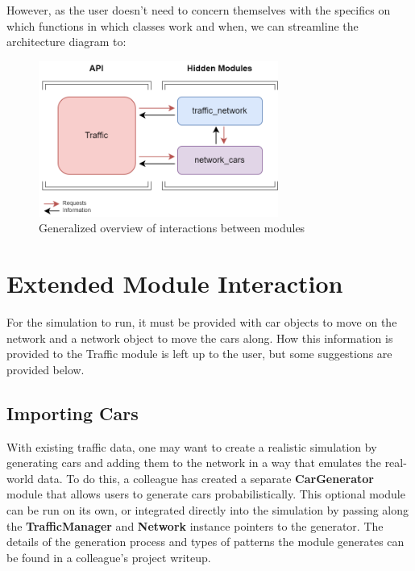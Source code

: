 \noindent  However, as the user doesn't need to concern themselves with the specifics on which functions in which classes work and when, we can streamline the architecture diagram to:

\begin{figure}[H]
    \centering
	\includegraphics[width=0.7\textwidth]{tex files/Figures/simplified_essentials.png}
	\caption[Software Interaction:  User View]{Generalized overview of interactions between modules}
	\label{fig:interactions_simplified}
\end{figure}



\section{Extended Module Interaction}

\par For the simulation to run, it must be provided with car objects to move on the network and a network object to move the cars along.  How this information is provided to the Traffic module is left up to the user, but some suggestions are provided below.

\subsection{Importing Cars}

\par With existing traffic data, one may want to create a realistic simulation by generating cars and adding them to the network in a way that emulates the real-world data.  To do this, a colleague has created a separate \textbf{CarGenerator} module that allows users to generate cars probabilistically.  This optional module can be run on its own, or integrated directly into the simulation by passing along the \textbf{TrafficManager} and \textbf{Network} instance pointers to the generator.  The details of the generation process and types of patterns the module generates can be found in a colleague's project writeup. \\

